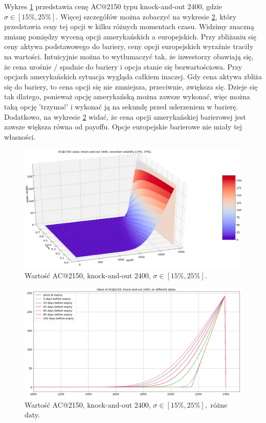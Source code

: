 \documentclass[12pt]{article}
\begin{document}
Wykres \ref{fig:ac_2150_2400_uv} przedstawia cenę AC@2150 typu knock-and-out 2400, gdzie $\sigma \in [15\%, 25\%].$ Więcej szczegółów można zobaczyć na wykresie \ref{fig:ac_2150_2400_diff_dates}, który przedstawia ceny tej opcji w kilku różnych momentach czasu. Widzimy znaczną zmianę pomiędzy wyceną opcji amerykańskich a europejskich. Przy zbliżaniu się ceny aktywa podstawowego do bariery, ceny opcji europejskich wyraźnie traciły na wartości. Intuicyjnie można to wytłumaczyć tak, że inwestorzy obawiają się, że cena urośnie / spadnie do bariery i opcja stanie się bezwartościowa. Przy opcjach amerykańskich sytuacja wygląda całkiem inaczej. Gdy cena aktywa zbliża się do bariery, to cena opcji się nie zmniejsza, przeciwnie, zwiększa się. Dzieje się tak dlatego, ponieważ opcję amerykańską można zawsze wykonać, więc można taką opcję 'trzymać' i wykonać ją na sekundę przed uderzeniem w barierę. Dodatkowo, na wykresie \ref{fig:ac_2150_2400_diff_dates} widać, że cena opcji amerykańskiej barierowej jest zawsze większa równa od payoffu. Opcje europejskie barierowe nie miały tej własności. 
\begin{figure}[H]
    \centering
    \includegraphics[width=\textwidth,height=\textheight,keepaspectratio]{ac_2150_2400_uv.png}
    \caption{Wartość AC@2150, knock-and-out 2400, $\sigma \in [15\%, 25\%].$}
    \label{fig:ac_2150_2400_uv}
\end{figure}

\begin{figure}[H]
    \centering
    \includegraphics[width=\textwidth,height=\textheight,keepaspectratio]{ac_2150_2400_diff_dates.png}
    \caption{Wartość AC@2150, knock-and-out 2400, $\sigma \in [15\%, 25\%],$ różne daty.}
    \label{fig:ac_2150_2400_diff_dates}
\end{figure}
\end{document}
